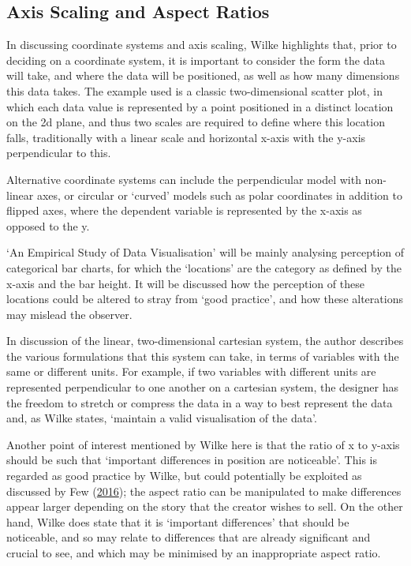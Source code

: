 \documentclass[
  11pt,
]{book}
\begin{document}
\subsection{Axis Scaling and Aspect Ratios}

In discussing coordinate systems and axis scaling, Wilke highlights
that, prior to deciding on a coordinate system, it is important to
consider the form the data will take, and where the data will be
positioned, as well as how many dimensions this data takes. The example
used is a classic two-dimensional scatter plot, in which each data value
is represented by a point positioned in a distinct location on the 2d
plane, and thus two scales are required to define where this location
falls, traditionally with a linear scale and horizontal x-axis with the
y-axis perpendicular to this.

Alternative coordinate systems can include the perpendicular model with
non-linear axes, or circular or `curved' models such as polar
coordinates in addition to flipped axes, where the dependent variable is
represented by the x-axis as opposed to the y.

`An Empirical Study of Data Visualisation' will be mainly analysing
perception of categorical bar charts, for which the `locations' are the
category as defined by the x-axis and the bar height. It will be
discussed how the perception of these locations could be altered to
stray from `good practice', and how these alterations may mislead the
observer.

In discussion of the linear, two-dimensional cartesian system, the
author describes the various formulations that this system can take, in
terms of variables with the same or different units. For example, if two
variables with different units are represented perpendicular to one
another on a cartesian system, the designer has the freedom to stretch
or compress the data in a way to best represent the data and, as Wilke
states, `maintain a valid visualisation of the data'.

Another point of interest mentioned by Wilke here is that the ratio of x
to y-axis should be such that `important differences in position are
noticeable'. This is regarded as good practice by Wilke, but could
potentially be exploited as discussed by Few
(\protect\hyperlink{ref-Few2016}{2016}); the aspect ratio can be
manipulated to make differences appear larger depending on the story
that the creator wishes to sell. On the other hand, Wilke does state
that it is `important differences' that should be noticeable, and so may
relate to differences that are already significant and crucial to see,
and which may be minimised by an inappropriate aspect ratio.
\end{document}
